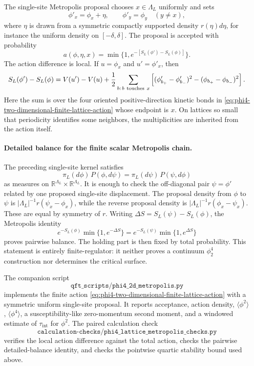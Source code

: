 The single-site Metropolis proposal chooses \(x\in\Lambda_L\) uniformly and
sets
\[
  \phi'_x=\phi_x+\eta,\qquad
  \phi'_y=\phi_y\quad (y\neq x),
\]
where \(\eta\) is drawn from a symmetric compactly supported density
\(r(\eta)d\eta\), for instance the uniform density on
\([-\delta,\delta]\).  The proposal is accepted with probability
\[
  a(\phi,\eta,x)=\min\{1,e^{-[S_L(\phi')-S_L(\phi)]}\}.
\]
The action difference is local.  If \(u=\phi_x\) and \(u'=\phi'_x\), then
\begin{equation}
  S_L(\phi')-S_L(\phi)
  =
  V(u')-V(u)
  +\frac12\sum_{b:\,b\ {\rm touches}\ x}
  \left[
    (\phi'_{b_+}-\phi'_{b_-})^2
    -
    (\phi_{b_+}-\phi_{b_-})^2
  \right].
  \label{eq:phi4-lattice-local-action-change}
\end{equation}
Here the sum is over the four oriented positive-direction kinetic bonds in
\eqref{eq:phi4-two-dimensional-finite-lattice-action} whose endpoint is
\(x\).  On lattices so small that periodicity identifies some neighbors,
the multiplicities are inherited from the action itself.

\paragraph{Detailed balance for the finite scalar Metropolis chain.}
The preceding single-site kernel satisfies
\[
  \pi_L(d\phi)\,P(\phi,d\psi)
  =
  \pi_L(d\psi)\,P(\psi,d\phi)
\]
as measures on \(\mathbb R^{\Lambda_L}\times\mathbb R^{\Lambda_L}\).  It is
enough to check the off-diagonal pair \(\psi=\phi'\) related by one proposed
single-site displacement.  The proposal density from \(\phi\) to \(\psi\) is
\(|\Lambda_L|^{-1}r(\psi_x-\phi_x)\), while the reverse proposal density is
\(|\Lambda_L|^{-1}r(\phi_x-\psi_x)\).  These are equal by symmetry of \(r\).
Writing \(\Delta S=S_L(\psi)-S_L(\phi)\), the Metropolis identity
\[
  e^{-S_L(\phi)}\min\{1,e^{-\Delta S}\}
  =
  e^{-S_L(\psi)}\min\{1,e^{\Delta S}\}
\]
proves pairwise balance.  The holding part is then fixed by total probability.
This statement is entirely finite-regulator: it neither proves a continuum
\(\phi^4_2\) construction nor determines the critical surface.

The companion script
\[
  \texttt{qft\_scripts/phi4\_2d\_metropolis.py}
\]
implements the finite action \eqref{eq:phi4-two-dimensional-finite-lattice-action}
with a symmetric uniform single-site proposal.  It reports acceptance,
action density, \(\langle\phi^2\rangle\), \(\langle\phi^4\rangle\), a
susceptibility-like zero-momentum second moment, and a windowed estimate of
\(\tau_{\mathrm{int}}\) for \(\phi^2\).  The paired calculation check
\[
  \texttt{calculation-checks/phi4\_lattice\_metropolis\_checks.py}
\]
verifies the local action difference against the total action, checks the
pairwise detailed-balance identity, and checks the pointwise quartic
stability bound used above.

